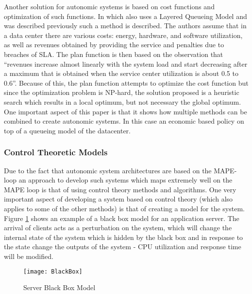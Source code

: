 Another solution for autonomic systems is based on cost functions and optimization of such functions. In \cite{related:model:lqm2} which also uses a Layered Queueing Model and was described previously such a method is described. The authors assume that in a data center there are various costs: energy, hardware, and software utilization, as well as revenues obtained by providing the service and penalties due to breaches of SLA. The plan function is then based on the observation that ``revenues increase almost linearly with the system load and start decreasing after a maximum that is obtained when the service center utilization is about 0.5 to 0.6''. Because of this, the plan function attempts to optimize the cost function but since the optimization problem is NP-hard, the solution proposed is a heuristic search which results in a local optimum, but not necessary the global optimum. One important aspect of this paper is that it shows how multiple methods can be combined to create autonomic systems. In this case an economic based policy on top of a queueing model of the datacenter.

\subsubsection{Control Theoretic Models}

Due to the fact that autonomic system architectures are based on the MAPE-loop an approach to develop such systems which maps extremely well on the MAPE loop is that of using control theory methods and algorithms. One very important aspect of developing a system based on control theory (which also applies to some of the other methods) is that of creating a model for the system. Figure \ref{fig:blackbox} shows an example of a black box model for an application server. The arrival of clients acts as a perturbation on the system, which will change the internal state of the system which is hidden by the black box and in response to the state change the outputs of the system - CPU utilization and response time will be modified.

\begin{figure}
	\centering
		\texttt{[image: BlackBox]}
	\caption{Server Black Box Model}
	\label{fig:blackbox}
\end{figure}

